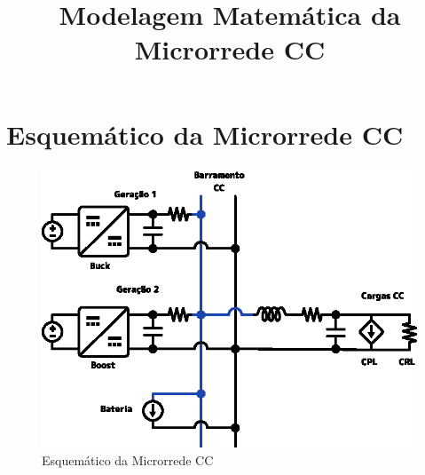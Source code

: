 \documentclass{article}
\title{Modelagem Matemática da Microrrede CC}
\author{}
\date{}
\begin{document}
\maketitle

\section*{Esquemático da Microrrede CC}

\begin{figure}[h]
  \centering
  \includegraphics[width=14cm]{assets/dc_microgrid.eps}
  \caption{Esquemático da Microrrede CC}
  \label{fig:exemplo}
\end{figure}





\end{document}
